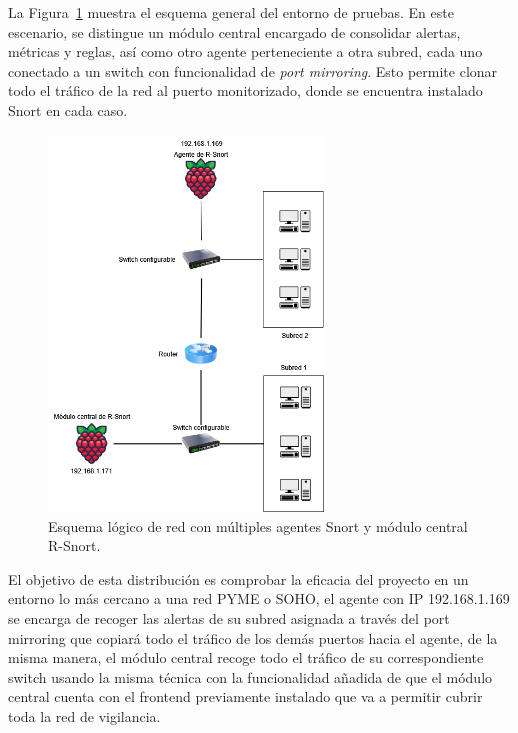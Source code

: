 \documentclass[11pt,a4paper,twoside]{report}
\begin{document}
La Figura~\ref{fig:esquema-red} muestra el esquema general del entorno de pruebas. En este escenario, se distingue un módulo central encargado de consolidar alertas, métricas y reglas, así como otro agente perteneciente a otra subred, cada uno conectado a un switch con funcionalidad de \textit{port mirroring}. Esto permite clonar todo el tráfico de la red al puerto monitorizado, donde se encuentra instalado Snort en cada caso.

\begin{figure}[H]
	\centering
	\includegraphics[width=0.65\textwidth]{documento/esquema_red.png}
	\caption{Esquema lógico de red con múltiples agentes Snort y módulo central R-Snort.}
	\label{fig:esquema-red}
\end{figure}

\newpage

El objetivo de esta distribución es comprobar la eficacia del proyecto en un entorno lo más cercano a una red PYME o SOHO, el agente con IP 192.168.1.169 se encarga de recoger las alertas de su subred asignada a través del port mirroring que copiará todo el tráfico de los demás puertos hacia el agente, de la misma manera, el módulo central recoge todo el tráfico de su correspondiente switch usando la misma técnica con la funcionalidad añadida de que el módulo central cuenta con el frontend previamente instalado que va a permitir cubrir toda la red de vigilancia.\newline
\end{document}
